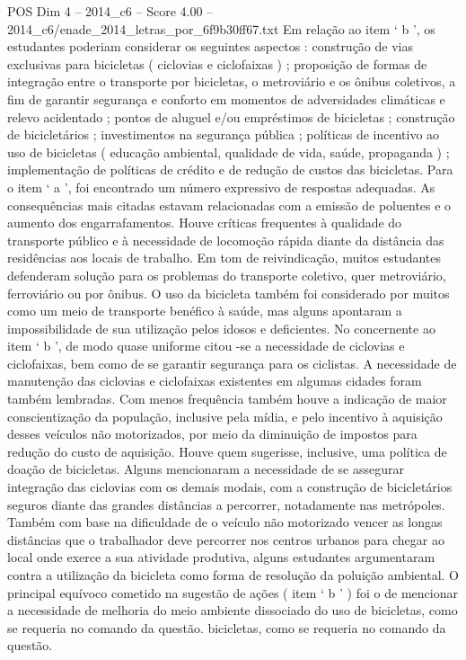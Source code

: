 \begin{textsample}{POS Dim 4 – 2014\_c6 – Score 4.00 – 2014\_c6/enade\_2014\_letras\_por\_6f9b30ff67.txt}
Em relação ao item ‘ b ’, os estudantes poderiam considerar os seguintes aspectos : construção de vias exclusivas para bicicletas ( ciclovias e ciclofaixas ) ; proposição de formas de integração entre o transporte por bicicletas, o metroviário e os ônibus coletivos, a fim de garantir segurança e conforto em momentos de adversidades climáticas e relevo acidentado ; pontos de aluguel e/ou empréstimos de bicicletas ; construção de bicicletários ; investimentos na segurança pública ; políticas de incentivo ao uso de bicicletas ( educação ambiental, qualidade de vida, saúde, propaganda ) ; implementação de políticas de crédito e de redução de custos das bicicletas.
Para o item ‘ a ’, foi encontrado um número expressivo de respostas adequadas.
As consequências mais citadas estavam relacionadas com a emissão de poluentes e o aumento dos engarrafamentos.
Houve críticas frequentes à qualidade do transporte público e à necessidade de locomoção rápida diante da distância das residências aos locais de trabalho.
Em tom de reivindicação, muitos estudantes defenderam solução para os problemas do transporte coletivo, quer metroviário, ferroviário ou por ônibus.
O uso da bicicleta também foi considerado por muitos como um meio de transporte benéfico à saúde, mas alguns apontaram a impossibilidade de sua utilização pelos idosos e deficientes.
No concernente ao item ‘ b ’, de modo quase uniforme citou -se a necessidade de ciclovias e ciclofaixas, bem como de se garantir segurança para os ciclistas.
A necessidade de manutenção das ciclovias e ciclofaixas existentes em algumas cidades foram também lembradas.
Com menos frequência também houve a indicação de maior conscientização da população, inclusive pela mídia, e pelo incentivo à aquisição desses veículos não motorizados, por meio da diminuição de impostos para redução do custo de aquisição.
Houve quem sugerisse, inclusive, uma política de doação de bicicletas.
Alguns mencionaram a necessidade de se assegurar integração das ciclovias com os demais modais, com a construção de bicicletários seguros diante das grandes distâncias a percorrer, notadamente nas metrópoles.
Também com base na dificuldade de o veículo não motorizado vencer as longas distâncias que o trabalhador deve percorrer nos centros urbanos para chegar ao local onde exerce a sua atividade produtiva, alguns estudantes argumentaram contra a utilização da bicicleta como forma de resolução da poluição ambiental.
O principal equívoco cometido na sugestão de ações ( item ‘ b ’ ) foi o de mencionar a necessidade de melhoria do meio ambiente dissociado do uso de bicicletas, como se requeria no comando da questão. bicicletas, como se requeria no comando da questão.

\end{textsample}
